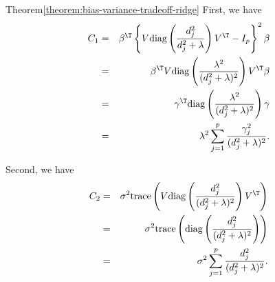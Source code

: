\begin{myproof}{Theorem}{\ref{theorem:bias-variance-tradeoff-ridge}}
First, we have 
\begin{eqnarray*}
C_1 &=&     \beta^{\T}      \left\{   V\text{diag}\left(  \frac{d_j^2}{d_j^2 + \lambda }  \right) V^{\T} - I_p   \right\}^2 \beta \\
&=&    \beta^{\T}      V  \text{diag}\left(  \frac{\lambda^2}{ (d_j^2 + \lambda)^2 }  \right)   V^{\T}     \beta \\
&=& \gamma^{\T}  \text{diag}\left(  \frac{\lambda^2}{ (d_j^2 + \lambda)^2 }  \right)   \gamma \\
&=& \lambda^{2}\sum_{j=1}^{p}\frac{\gamma_{j}^{2}}{( d_j^2 +\lambda)^{2}} . 
\end{eqnarray*}


Second, we have 
\begin{eqnarray*}
C_2 &=&  \sigma^2 \text{trace} \left( V\text{diag}\left(  \frac{d_j^2}{(d_j^2 + \lambda)^2 }  \right)   V^{\T} \right) \\
&=& \sigma^2 \text{trace} \left( \text{diag}\left(  \frac{d_j^2}{(d_j^2 + \lambda)^2 }  \right ) \right) \\
&=& \sigma^{2}\sum_{j=1}^{p}\frac{ d_j^2 }{( d_j^2 +\lambda)^{2}}. 
\end{eqnarray*}


\end{myproof}
